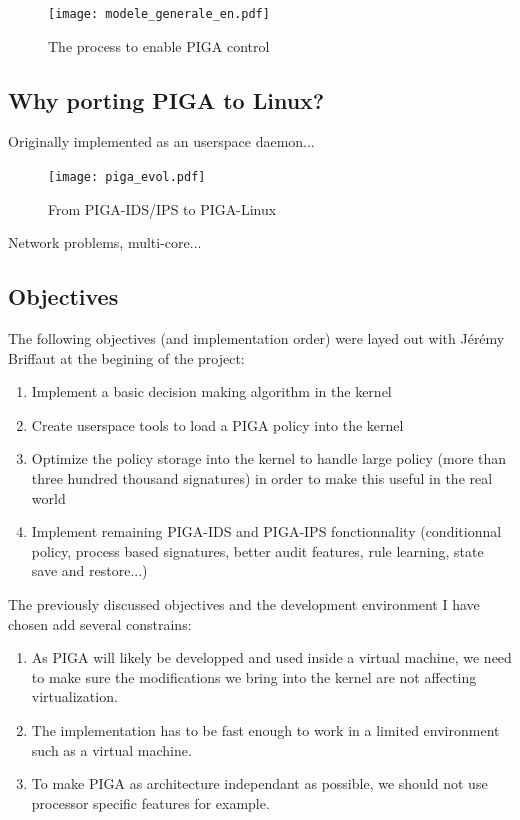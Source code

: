 \documentclass[pdftex,a4paper,titlepage,11pt]{article}
\begin{document}
\begin{figure}[h]
	\centering
	\texttt{[image: modele\_generale\_en.pdf]}
	\caption{The process to enable PIGA control}
	\label{PIGAARCHI}
\end{figure}

\subsection{Why porting PIGA to Linux?}

Originally implemented as an userspace daemon...

\begin{figure}[h]
	\centering
	\texttt{[image: piga\_evol.pdf]}
	\caption{From PIGA-IDS/IPS to PIGA-Linux}
	\label{PIGAEVOL}
\end{figure}

Network problems, multi-core...

\subsection{Objectives}

The following objectives (and implementation order) were layed out with Jérémy
Briffaut at the begining of the project:

\begin{enumerate}
	\item Implement a basic decision making algorithm in the kernel
	\item Create userspace tools to load a PIGA policy into the kernel
	\item Optimize the policy storage into the kernel to handle large policy
(more than three hundred thousand signatures) in order to make this useful in
the real world
	\item Implement remaining PIGA-IDS and PIGA-IPS fonctionnality (conditionnal
policy, process based signatures, better audit features, rule learning, state
save and restore...)
\end{enumerate}

\smallskip

The previously discussed objectives and the development environment I have
chosen add several constrains:

\begin{enumerate}
	\item As PIGA will likely be developped and used inside a virtual machine,
we need to make sure the modifications we bring into the kernel are not
affecting virtualization.
	\item The implementation has to be fast enough to work in a limited
environment such as a virtual machine.
	\item To make PIGA as architecture independant as possible, we should not
use processor specific features for example.
\end{enumerate}
\end{document}
